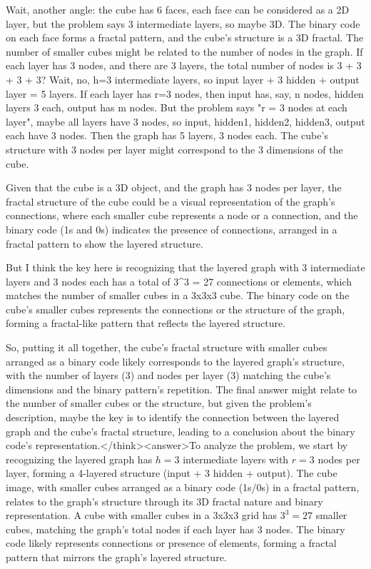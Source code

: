 Wait, another angle: the cube has 6 faces, each face can be considered as a 2D layer, but the problem says 3 intermediate layers, so maybe 3D. The binary code on each face forms a fractal pattern, and the cube's structure is a 3D fractal. The number of smaller cubes might be related to the number of nodes in the graph. If each layer has 3 nodes, and there are 3 layers, the total number of nodes is 3 + 3 + 3 + 3? Wait, no, h=3 intermediate layers, so input layer + 3 hidden + output layer = 5 layers. If each layer has r=3 nodes, then input has, say, n nodes, hidden layers 3 each, output has m nodes. But the problem says "r = 3 nodes at each layer", maybe all layers have 3 nodes, so input, hidden1, hidden2, hidden3, output each have 3 nodes. Then the graph has 5 layers, 3 nodes each. The cube's structure with 3 nodes per layer might correspond to the 3 dimensions of the cube.

Given that the cube is a 3D object, and the graph has 3 nodes per layer, the fractal structure of the cube could be a visual representation of the graph's connections, where each smaller cube represents a node or a connection, and the binary code (1s and 0s) indicates the presence of connections, arranged in a fractal pattern to show the layered structure.

But I think the key here is recognizing that the layered graph with 3 intermediate layers and 3 nodes each has a total of 3^3 = 27 connections or elements, which matches the number of smaller cubes in a 3x3x3 cube. The binary code on the cube's smaller cubes represents the connections or the structure of the graph, forming a fractal-like pattern that reflects the layered structure.

So, putting it all together, the cube's fractal structure with smaller cubes arranged as a binary code likely corresponds to the layered graph's structure, with the number of layers (3) and nodes per layer (3) matching the cube's dimensions and the binary pattern's repetition. The final answer might relate to the number of smaller cubes or the structure, but given the problem's description, maybe the key is to identify the connection between the layered graph and the cube's fractal structure, leading to a conclusion about the binary code's representation.</think><answer>To analyze the problem, we start by recognizing the layered graph has \( h = 3 \) intermediate layers with \( r = 3 \) nodes per layer, forming a 4-layered structure (input + 3 hidden + output). The cube image, with smaller cubes arranged as a binary code (1s/0s) in a fractal pattern, relates to the graph's structure through its 3D fractal nature and binary representation. A cube with smaller cubes in a 3x3x3 grid has \( 3^3 = 27 \) smaller cubes, matching the graph's total nodes if each layer has 3 nodes. The binary code likely represents connections or presence of elements, forming a fractal pattern that mirrors the graph's layered structure.  


